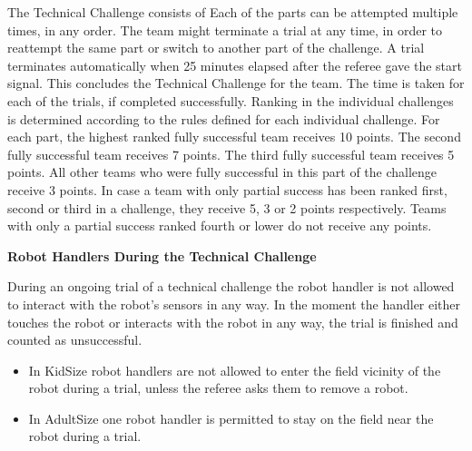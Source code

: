 The Technical Challenge consists of 
Each of the parts can be attempted multiple times, in any order.
The team might terminate a trial at any time,
in order to reattempt the same part or switch to another part of the challenge.
A trial terminates automatically when 25 minutes elapsed after the referee gave
the start signal.
This concludes the Technical Challenge for the team.
The time is taken for each of the trials, if completed successfully.
Ranking in the individual challenges is determined according to the rules
defined for each individual challenge.
For each part, the highest ranked fully successful team receives 10 points.
The second fully successful team receives 7 points.
The third fully successful team receives 5 points.
All other teams who were fully successful in this part of the challenge receive 3 points.
In case a team with only partial success has been ranked first, second or third in a challenge, they receive 5, 3 or 2 points respectively.
Teams with only a partial success ranked fourth or lower do not receive any points.

\bigskip

{\bfseries Robot Handlers During the Technical Challenge}

\headlinebox

During an ongoing trial of a technical challenge the robot handler is not allowed to interact with the robot's sensors in any way. In the moment the handler either touches the robot or interacts with the robot in any way, the trial is finished and counted as unsuccessful.

\begin{itemize}
\item In KidSize robot handlers are not allowed to enter
      the field vicinity of the robot during a trial,
      unless the referee asks them to remove a robot.
\item In AdultSize one robot handler is permitted to stay on the field near the robot during a trial.
\end{itemize}
